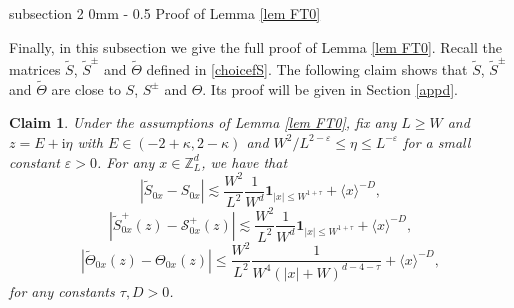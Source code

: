 \documentclass{article}
\makeatletter
\newcommand{\1}{\mathds{1}}
\numberwithin{equation}{section}
\newcommand{\be}{\begin{equation}}
\newcommand{\ee}{\end{equation}}
\newcommand{\e}{{\varepsilon}}
\renewcommand{\cal}{\mathcal}
\newcommand{\wt}{\widetilde}
\newcommand{\ii}{\mathrm{i}} %
\renewcommand{\leq}{\leqslant}
\renewcommand{\geq}{\geqslant}
\renewcommand{\le}{\leq}
\renewcommand{\ge}{\geq}
\newcommand{\Z}{\mathbb{Z}}
\DeclareMathOperator{\OO}{O}
\theoremstyle{plain} %
\newtheorem{claim}[theorem]{Claim}
\theoremstyle{remark}
\renewcommand{\subsection}{\@startsection
{subsection}%
{2}%
{0mm}%
{-\baselineskip}%
{0.5\baselineskip}%
{\normalfont\bf\itshape}} %
\makeatother
\begin{document}
\subsection{Proof of Lemma \ref{lem FT0}}\label{sec pf FT0}
 
Finally, in this subsection we give the full proof of Lemma \ref{lem FT0}. Recall the matrices $\wt S$, $\wt S^{\pm}$ and $\wt\Theta$ defined in \eqref{choicefS}. 
The following claim shows that $\wt S$, $\wt S^\pm$ and $\wt\Theta$ are close to $ S$, $ S^\pm$ and $ \Theta$. Its proof will be given in Section \ref{appd}.
\begin{claim}\label{claim wtS-S}
	Under the assumptions of Lemma \ref{lem FT0}, fix any $L\ge W$ and $z=E+\ii \eta$ with $E\in (-2+\kappa,2-\kappa)$ and $W^{2}/L^{2-\e}\le \eta\le L^{-\e}$ for a small constant $\e>0$. For any $x\in \Z_L^d$, we have that  
	\be\label{S0xy3}
	|\wt S_{0x} - S_{0x} | \lesssim \frac{W^2}{L^2}\frac{1}{W^d}\mathbf 1_{|x|\le W^{1+\tau}} +  \langle x\rangle^{-D} , 
	\ee
	\be\label{S+xy3}
	|\wt S^+_{0x}(z)- \cal S^{+}_{0x}(z)| \lesssim \frac{W^2}{L^2}\frac{1}{W^d }\mathbf 1_{|x|\le W^{1+\tau}} +  \langle x\rangle^{-D} , %
	\ee
	\be\label{Theta-wh3}
	|\wt \Theta_{0x}(z)-\Theta_{0x}(z)|\le \frac{W^2}{L^2}\frac{1}{W^4(|x|+W)^{d-4-\tau}}+ \langle x\rangle^{-D} ,
	\ee
 for any constants $\tau,D>0$.
\end{claim}
\end{document}
